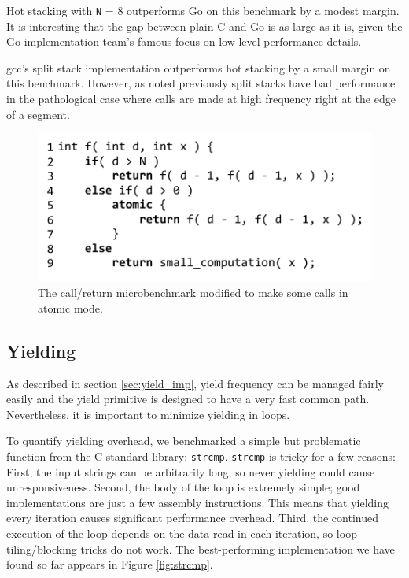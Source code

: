 \documentclass[acmsmall,anonymous,review]{acmart}\settopmatter{printfolios=true,printccs=false,printacmref=false}
\begin{document}
Hot stacking with \texttt{N} = 8 outperforms Go on this benchmark by a modest margin.
It is interesting that the gap between plain C and Go is as large as it is, given the Go implementation team's famous focus on low-level performance details.

gcc's split stack implementation outperforms hot stacking by a small margin on this benchmark.
However, as noted previously split stacks have bad performance in the pathological case where calls are made at high frequency right at the edge of a segment.

\begin{figure}
\includegraphics{Code/just_calling_n_benchmark}
\caption{The call/return microbenchmark modified to make some calls in atomic mode.}
\label{fig:micro_calling_n}
\end{figure}

\subsection{Yielding}

As described in section \ref{sec:yield_imp}, yield frequency can be managed fairly easily and the yield primitive is designed to have a very fast common path.
Nevertheless, it is important to minimize yielding in loops.

To quantify yielding overhead, we benchmarked a simple but problematic function from the C standard library: \texttt{strcmp}.
\texttt{strcmp} is tricky for a few reasons:
First, the input strings can be arbitrarily long, so never yielding could cause unresponsiveness.
Second, the body of the loop is extremely simple; good implementations are just a few assembly instructions.
This means that yielding every iteration causes significant performance overhead.
Third, the continued execution of the loop depends on the data read in each iteration, so loop tiling/blocking tricks do not work.
The best-performing implementation we have found so far appears in Figure \ref{fig:strcmp}.
\end{document}
